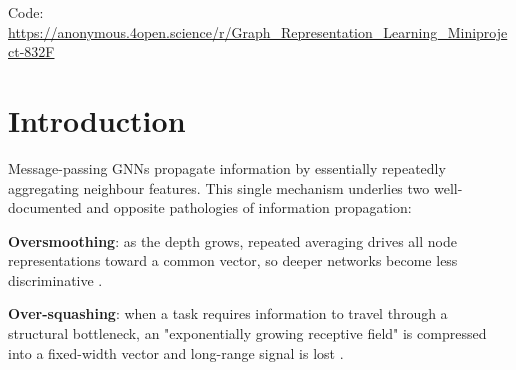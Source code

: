 \documentclass[inlineanswers]{exam2024}
\begin{document}
\begin{abstract}
\noindent
Oversmoothing and over-squashing are two types of failures of information propagation in graph neural networks (GNNs): the first destroys signal essentially by too much mixing at depth, the latter by too little signal surviving a topological bottleneck. Two methods target them separately - residual (skip) connections for oversmoothing (as tested in one of our practicals) and graph rewiring for over-squashing. This miniproject studies whether these remedies complement each other or whether fixing one failure mode worsens the other. Using two controlled synthetic datasets (a stochastic block model for oversmoothing, a barbell signal-propagation task for over-squashing) and a $2\times2$ design over \{plain, skip\}$\times$\{original, rewired\}, evaluated across five seeds, we find a (fairly interesting but in the end not surprising) trade-off: curvature-based rewiring - as anticipated - fixes over-squashing but worsens oversmoothing, while skip connections mitigate oversmoothing + moderate over-squashing but fail on longer bottlenecks. Only the combination is robust on both axes. The mechanism is checked with Jacobian-sensitivity and Ollivier-Ricci curvature metrics.
\end{abstract}

\begin{center}
\small Code: \url{https://anonymous.4open.science/r/Graph_Representation_Learning_Miniproject-832F} 
\end{center}

\section{Introduction}
\label{sec:intro}

Message-passing GNNs propagate information by essentially repeatedly aggregating neighbour features. This single mechanism underlies two well-documented and opposite pathologies of information propagation:

\textbf{Oversmoothing}: as the depth grows, repeated averaging drives all node representations toward a common vector, so deeper networks become less discriminative
\cite{li2018deeper,oono2020,rusch2023survey}. 

\textbf{Over-squashing}: when a task requires information to travel through a structural bottleneck, an "exponentially growing receptive field" is compressed into a fixed-width vector and long-range signal is lost \cite{alon2021,topping2022,digiovanni2023}.
\end{document}

